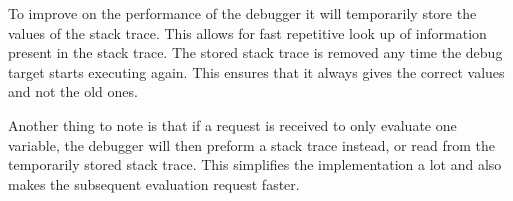 To improve on the performance of the debugger it will temporarily store the values of the stack trace.
This allows for fast repetitive look up of information present in the stack trace.
The stored stack trace is removed any time the debug target starts executing again.
This ensures that it always gives the correct values and not the old ones.


Another thing to note is that if a request is received to only evaluate one variable, the debugger will then preform a stack trace instead, or read from the temporarily stored stack trace.
This simplifies the implementation a lot and also makes the subsequent evaluation request faster.

